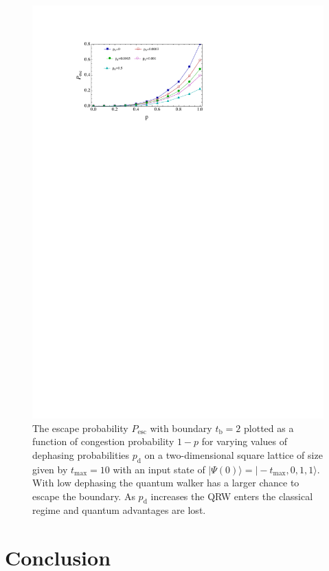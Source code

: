 \documentclass[aps,pra,twocolumn,amsmath,amssymb,nofootinbib,superscriptaddress]{revtex4}
\newcommand{\ket}[1]{|#1\rangle}
\begin{document}
\begin{figure}[]
\includegraphics[scale=0.88]{PescPPd.pdf}
\caption{\label{fig:PescPPd} The escape probability $P_{\mathrm{esc}}$ with boundary $t_\mathrm{b}=2$ plotted as a function of congestion probability $1-p$ for varying values of dephasing probabilities $p_{\mathrm{d}}$ on a two-dimensional square lattice of size given by $t_\mathrm{max}=10$ with an input state of $\ket{\Psi(0)}=\ket{-t_\mathrm{max},0,1,1}$. With low dephasing the quantum walker has a larger chance to escape the boundary. As $p_{\mathrm{d}}$ increases the QRW enters the classical regime and quantum advantages are lost.}
\end{figure}

\section{Conclusion}
\end{document}
